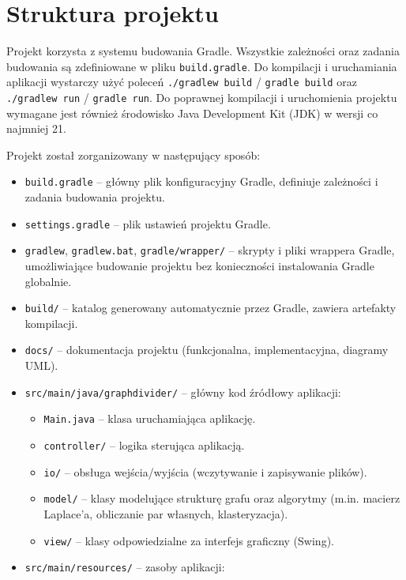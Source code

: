 \documentclass{article}
\begin{document}
\section{Struktura projektu}

    Projekt korzysta z systemu budowania Gradle. Wszystkie zależności oraz zadania budowania są zdefiniowane w pliku \texttt{build.gradle}. Do kompilacji i uruchamiania aplikacji wystarczy użyć poleceń \texttt{./gradlew build} / \texttt{gradle build} oraz \texttt{./gradlew run} / \texttt{gradle run}. Do poprawnej kompilacji i uruchomienia projektu wymagane jest również środowisko Java Development Kit (JDK) w wersji co najmniej 21.

    Projekt został zorganizowany w następujący sposób:

    \begin{itemize}
        \item \texttt{build.gradle} -- główny plik konfiguracyjny Gradle, definiuje zależności i zadania budowania projektu.
        \item \texttt{settings.gradle} -- plik ustawień projektu Gradle.
        \item \texttt{gradlew}, \texttt{gradlew.bat}, \texttt{gradle/wrapper/} -- skrypty i pliki wrappera Gradle, umożliwiające budowanie projektu bez konieczności instalowania Gradle globalnie.
        \item \texttt{build/} -- katalog generowany automatycznie przez Gradle, zawiera artefakty kompilacji.
        \item \texttt{docs/} -- dokumentacja projektu (funkcjonalna, implementacyjna, diagramy UML).
        \item \texttt{src/main/java/graphdivider/} -- główny kod źródłowy aplikacji:
        \begin{itemize}
            \item \texttt{Main.java} -- klasa uruchamiająca aplikację.
            \item \texttt{controller/} -- logika sterująca aplikacją.
            \item \texttt{io/} -- obsługa wejścia/wyjścia (wczytywanie i zapisywanie plików).
            \item \texttt{model/} -- klasy modelujące strukturę grafu oraz algorytmy (m.in. macierz Laplace'a, obliczanie par własnych, klasteryzacja).
            \item \texttt{view/} -- klasy odpowiedzialne za interfejs graficzny (Swing).
        \end{itemize}
        \item \texttt{src/main/resources/} -- zasoby aplikacji:

\end{itemize}
\end{document}
